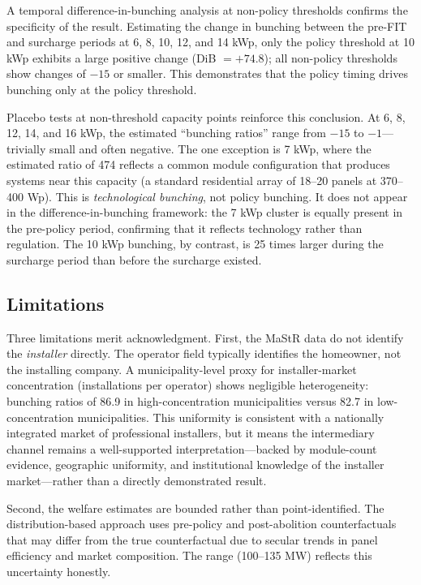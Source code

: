 \documentclass[12pt]{article}
\begin{document}
A temporal difference-in-bunching analysis at non-policy thresholds confirms the specificity of the result. Estimating the change in bunching between the pre-FIT and surcharge periods at 6, 8, 10, 12, and 14 kWp, only the policy threshold at 10 kWp exhibits a large positive change (DiB $= +74.8$); all non-policy thresholds show changes of $-15$ or smaller. This demonstrates that the policy timing drives bunching only at the policy threshold.

Placebo tests at non-threshold capacity points reinforce this conclusion. At 6, 8, 12, 14, and 16 kWp, the estimated ``bunching ratios'' range from $-15$ to $-1$---trivially small and often negative. The one exception is 7 kWp, where the estimated ratio of 474 reflects a common module configuration that produces systems near this capacity (a standard residential array of 18--20 panels at 370--400 Wp). This is \textit{technological bunching}, not policy bunching. It does not appear in the difference-in-bunching framework: the 7 kWp cluster is equally present in the pre-policy period, confirming that it reflects technology rather than regulation. The 10 kWp bunching, by contrast, is 25 times larger during the surcharge period than before the surcharge existed.

\subsection{Limitations}

Three limitations merit acknowledgment. First, the MaStR data do not identify the \textit{installer} directly. The operator field typically identifies the homeowner, not the installing company. A municipality-level proxy for installer-market concentration (installations per operator) shows negligible heterogeneity: bunching ratios of 86.9 in high-concentration municipalities versus 82.7 in low-concentration municipalities. This uniformity is consistent with a nationally integrated market of professional installers, but it means the intermediary channel remains a well-supported interpretation---backed by module-count evidence, geographic uniformity, and institutional knowledge of the installer market---rather than a directly demonstrated result.

Second, the welfare estimates are bounded rather than point-identified. The distribution-based approach uses pre-policy and post-abolition counterfactuals that may differ from the true counterfactual due to secular trends in panel efficiency and market composition. The range (100--135 MW) reflects this uncertainty honestly.
\end{document}
